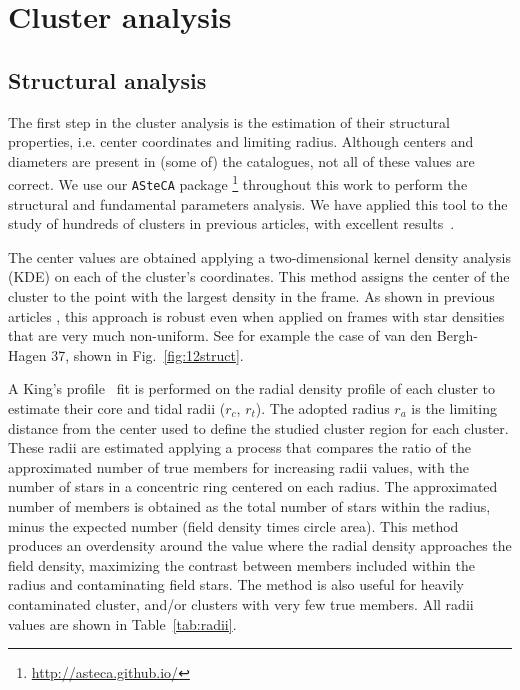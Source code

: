 \documentclass[draft]{aa}
\begin{document}
\section{Cluster analysis}
 \label{sec:clust_analy}

 \subsection{Structural analysis}

  The first step in the cluster analysis is the estimation of their structural
  properties, i.e. center coordinates and limiting radius. Although centers and
  diameters are present in (some of) the catalogues, not all of these values are
  correct. We use our \texttt{ASteCA} package
  \citep{Perren_2015}\footnote{\url{http://asteca.github.io/}} throughout this
  work to perform the structural and fundamental parameters analysis. We have
  applied this tool to the study of hundreds of clusters in previous articles,
  with excellent results~\citep{Perren_2017,Perren_2020}.

  The center values are obtained applying a two-dimensional kernel density
  analysis (KDE) on each of the cluster's coordinates. This method assigns the
  center of the cluster to the point with the largest density in the frame. As
  shown in previous articles \citep{Perren_2015,Perren_2017,Perren_2020}, this
  approach is robust even when applied on frames with star densities that
  are very much non-uniform. See for example the case of van den Bergh-Hagen 37,
  shown in Fig.~\ref{fig:12struct}.

  A King's profile~\citep{King_1962} fit is performed on the radial
  density profile of each cluster to estimate their core and tidal radii
  ($r_{c}$, $r_{t}$). The adopted radius $r_{a}$ is the limiting distance from
  the center used to define the studied cluster region for each cluster. These
  radii are estimated applying a process that compares the ratio of the
  approximated number of true members for increasing radii values, with the
  number of stars in a concentric ring centered on each radius. The
  approximated number of members is obtained as the total number of stars within
  the radius, minus the expected number (field density times circle area). This
  method produces an overdensity around the value where the radial density
  approaches the field density, maximizing the contrast between members included
  within the radius and contaminating field stars. The method is also useful
  for heavily contaminated cluster, and/or clusters with very few true
  members. All radii values are shown in Table~\ref{tab:radii}.\\
\end{document}
